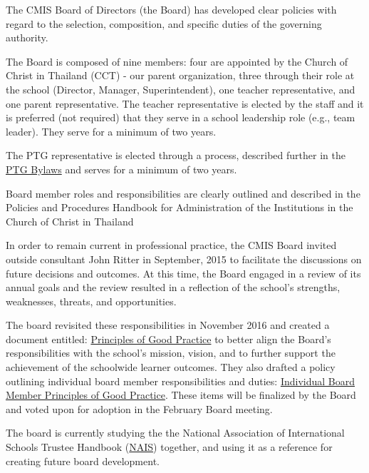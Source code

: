 \begin{findings}
The CMIS Board of Directors (the Board) has developed clear policies with regard to the selection, composition, and specific duties of the governing authority. 

The Board is composed of nine members: four are appointed by the Church of Christ in Thailand (CCT) - our parent organization, three through their role at the school (Director, Manager, Superintendent), one teacher representative, and one parent representative. The teacher representative is elected by the staff and it is preferred (not required) that they serve in a school leadership role (e.g., team leader). They serve for a minimum of two years.

The PTG representative is elected through a process, described further in the \href{http://blogs.cmis.ac.th/ptg/bylaws/}{PTG Bylaws} and serves for a minimum of two years.

Board member roles and responsibilities are clearly outlined and described in the Policies and Procedures Handbook for Administration of the Institutions in the Church of Christ in Thailand

In order to remain current in professional practice, the CMIS Board invited outside consultant John Ritter in September, 2015 to facilitate the discussions on future decisions and outcomes. At this time, the Board engaged in a review of its annual goals and the review resulted in a reflection of the school's strengths, weaknesses, threats, and opportunities. 

The board revisited these responsibilities in November 2016 and created a document entitled:  \href{https://docs.google.com/document/d/1EyIeD5g0RDANtZzH5rsCkvDp5ea_bQ2G9rWnhz4QbSc/edit?ts=5881d18d}{Principles of Good Practice}  to better align the Board’s responsibilities with the school’s mission, vision, and to further support the achievement of the schoolwide learner outcomes. They also drafted a policy outlining individual board member responsibilities and duties: \href{https://docs.google.com/document/d/14e90Qr4edga9mEZuHIclWeraZ5jgq052IUwcnxTHQZw/edit?ts=5881b471}{Individual Board Member Principles of Good Practice}. These items will be finalized by the Board and voted upon for adoption in the February Board meeting.

The board is currently studying the the National Association of International Schools Trustee Handbook (\href{http://www.nais.org/Articles/Pages/NAIS-Trustee-Handbook-Resources.aspx}{NAIS}) together, and using it as a reference for creating future board development.


\end{findings}
